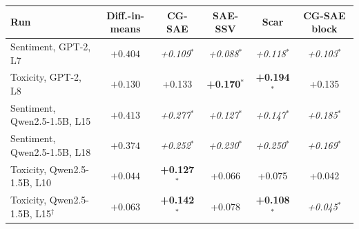 \begin{tabular}{@{}l c cccc@{}}
\toprule
Run & Diff.-in-means & CG-SAE & SAE-SSV & Scar & CG-SAE block \\
\midrule
Sentiment, GPT-2, L7 & $+0.404$ & \textit{+0.109}$^{*}$ & \textit{+0.088}$^{*}$ & \textit{+0.118}$^{*}$ & \textit{+0.103}$^{*}$ \\
Toxicity, GPT-2, L8 & $+0.130$ & +0.133 & \textbf{+0.170}$^{*}$ & \textbf{+0.194}$^{*}$ & +0.135 \\
\midrule
Sentiment, Qwen2.5-1.5B, L15 & $+0.413$ & \textit{+0.277}$^{*}$ & \textit{+0.127}$^{*}$ & \textit{+0.147}$^{*}$ & \textit{+0.185}$^{*}$ \\
Sentiment, Qwen2.5-1.5B, L18 & $+0.374$ & \textit{+0.252}$^{*}$ & \textit{+0.230}$^{*}$ & \textit{+0.250}$^{*}$ & \textit{+0.169}$^{*}$ \\
Toxicity, Qwen2.5-1.5B, L10 & $+0.044$ & \textbf{+0.127}$^{*}$ & +0.066 & +0.075 & +0.042 \\
Toxicity, Qwen2.5-1.5B, L15$^{\dagger}$ & $+0.063$ & \textbf{+0.142}$^{*}$ & +0.078 & \textbf{+0.108}$^{*}$ & \textit{+0.045}$^{*}$ \\
\bottomrule
\end{tabular}